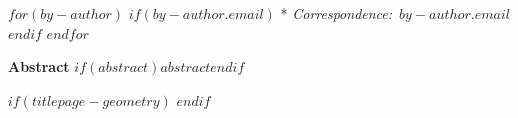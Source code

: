 \begin{minipage}[b][\textheight][s]{\textwidth}
$for(by-author)$
$if(by-author.email)$
* \textit{Correspondence:}~$by-author.email$
$endif$
$endfor$

\vfill
\textbf{\Large{Abstract}}\newline
$if(abstract)${$abstract$}$endif$%



\vfill


\vspace{1\baselineskip} 


\end{minipage}
$if(titlepage-geometry)$
\restoregeometry
$endif$